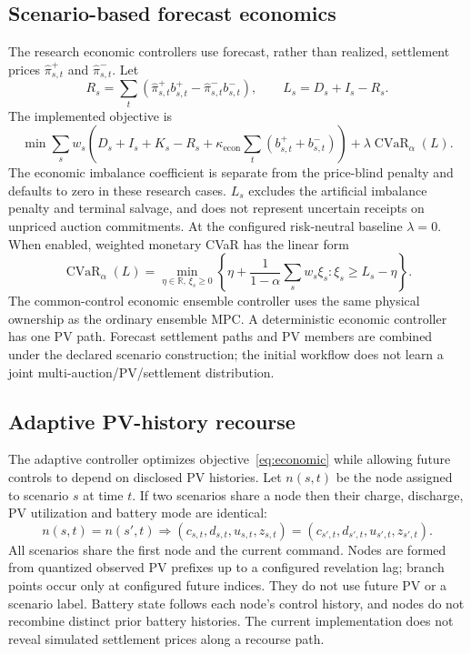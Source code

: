 \documentclass[11pt,a4paper]{article}
\newcommand{\R}{\mathbb{R}}
\DeclareMathOperator{\CVaR}{CVaR}
\begin{document}
\subsection{Scenario-based forecast economics}
The research economic controllers use forecast, rather than realized,
settlement prices $\hat\pi^+_{s,t}$ and $\hat\pi^-_{s,t}$. Let
\begin{equation}
 R_s=\sum_t(\hat\pi^+_{s,t}b^+_{s,t}-\hat\pi^-_{s,t}b^-_{s,t}),
 \qquad L_s=D_s+I_s-R_s.
\end{equation}
The implemented objective is
\begin{equation}\label{eq:economic}
 \min\sum_s w_s\left(D_s+I_s+K_s-R_s+
 \kappa_{\mathrm{econ}}\sum_t(b^+_{s,t}+b^-_{s,t})\right)
 +\lambda\CVaR_\alpha(L).
\end{equation}
The economic imbalance coefficient is separate from the price-blind penalty
and defaults to zero in these research cases. $L_s$ excludes the artificial
imbalance penalty and terminal salvage, and does not represent uncertain
receipts on unpriced auction commitments. At the configured risk-neutral
baseline $\lambda=0$. When enabled, weighted monetary CVaR has the linear form
\begin{equation}
 \CVaR_\alpha(L)=\min_{\eta\in\R,\,\xi_s\ge0}
 \left\{\eta+\frac{1}{1-\alpha}\sum_s w_s\xi_s:
 \xi_s\ge L_s-\eta\right\}.
\end{equation}
The common-control economic ensemble controller uses the same physical
ownership as the ordinary ensemble MPC. A deterministic economic controller
has one PV path. Forecast settlement paths and PV members are combined under
the declared scenario construction; the initial workflow does not learn a
joint multi-auction/PV/settlement distribution.

\subsection{Adaptive PV-history recourse}
The adaptive controller optimizes objective~\eqref{eq:economic} while allowing
future controls to depend on disclosed PV histories. Let $n(s,t)$ be the node
assigned to scenario $s$ at time $t$. If two scenarios share a node then their
charge, discharge, PV utilization and battery mode are identical:
\begin{equation}
 n(s,t)=n(s',t)\Longrightarrow
 (c_{s,t},d_{s,t},u_{s,t},z_{s,t})
 =(c_{s',t},d_{s',t},u_{s',t},z_{s',t}).
\end{equation}
All scenarios share the first node and the current command. Nodes are formed
from quantized observed PV prefixes up to a configured revelation lag; branch
points occur only at configured future indices. They do not use future PV or a
scenario label. Battery state follows each node's control history, and nodes do
not recombine distinct prior battery histories. The current implementation does
not reveal simulated settlement prices along a recourse path.
\end{document}
